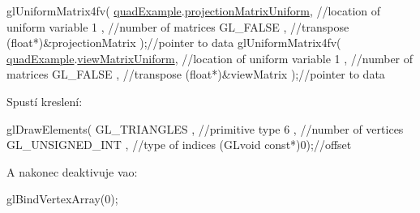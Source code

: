 \begin{DoxyCodeInclude}
  glUniformMatrix4fv(
      \hyperlink{quadExample_8c_ad961415145a9c30bd9846d4a278cc63a}{quadExample}.\hyperlink{structQuadExampleVariables_a38a1023cb8ee3692e195ea574e43c51a}{projectionMatrixUniform}, \textcolor{comment}{//location of uniform variable}
      1                                  , \textcolor{comment}{//number of matrices}
      GL\_FALSE                           , \textcolor{comment}{//transpose}
      (\textcolor{keywordtype}{float}*)&projectionMatrix          );\textcolor{comment}{//pointer to data}
  glUniformMatrix4fv(
      \hyperlink{quadExample_8c_ad961415145a9c30bd9846d4a278cc63a}{quadExample}.\hyperlink{structQuadExampleVariables_a9c505e0a089ecd495b18550309ebab77}{viewMatrixUniform}, \textcolor{comment}{//location of uniform variable}
      1                            , \textcolor{comment}{//number of matrices}
      GL\_FALSE                     , \textcolor{comment}{//transpose}
      (\textcolor{keywordtype}{float}*)&viewMatrix          );\textcolor{comment}{//pointer to data}
\end{DoxyCodeInclude}
Spustí kreslení\-: 
\begin{DoxyCodeInclude}
  glDrawElements(
      GL\_TRIANGLES    , \textcolor{comment}{//primitive type}
      6               , \textcolor{comment}{//number of vertices}
      GL\_UNSIGNED\_INT , \textcolor{comment}{//type of indices}
      (GLvoid \textcolor{keyword}{const}*)0);\textcolor{comment}{//offset}
\end{DoxyCodeInclude}
A nakonec deaktivuje vao\-: 
\begin{DoxyCodeInclude}
  glBindVertexArray(0);
\end{DoxyCodeInclude}
 
\begin{DoxyCodeInclude}
\end{DoxyCodeInclude}
 
